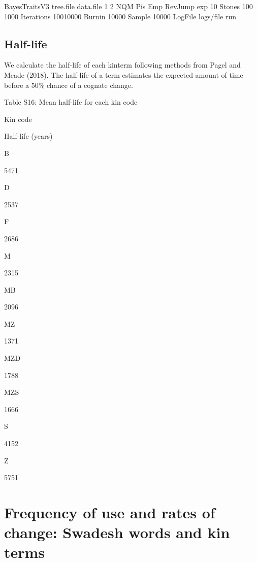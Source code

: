 \documentclass[]{article}
\newenvironment{Shaded}{\begin{snugshade}}{\end{snugshade}}
\newcommand{\ExtensionTok}[1]{#1}
\newcommand{\NormalTok}[1]{#1}
\begin{document}
\begin{Shaded}
\begin{Highlighting}[]
\ExtensionTok{BayesTraitsV3}\NormalTok{ tree.file data.file }
\ExtensionTok{1}
\ExtensionTok{2}
\ExtensionTok{NQM}
\ExtensionTok{Pis}\NormalTok{ Emp}
\ExtensionTok{RevJump}\NormalTok{ exp 10}
\ExtensionTok{Stones}\NormalTok{ 100 1000}
\ExtensionTok{Iterations}\NormalTok{ 10010000}
\ExtensionTok{Burnin}\NormalTok{ 10000}
\ExtensionTok{Sample}\NormalTok{ 10000}
\ExtensionTok{LogFile}\NormalTok{ logs/file}
\ExtensionTok{run}
\end{Highlighting}
\end{Shaded}

\hypertarget{half-life}{%
\subsection{Half-life}\label{half-life}}

We calculate the half-life of each kinterm following methods from Pagel
and Meade (2018). The half-life of a term estimates the expected amount
of time before a 50\% chance of a cognate change.

Table S16: Mean half-life for each kin code

Kin code

Half-life (years)

B

5471

D

2537

F

2686

M

2315

MB

2096

MZ

1371

MZD

1788

MZS

1666

S

4152

Z

5751

\hypertarget{frequency-of-use-and-rates-of-change-swadesh-words-and-kin-terms}{%
\section{Frequency of use and rates of change: Swadesh words and kin
terms}\label{frequency-of-use-and-rates-of-change-swadesh-words-and-kin-terms}}
\end{document}
